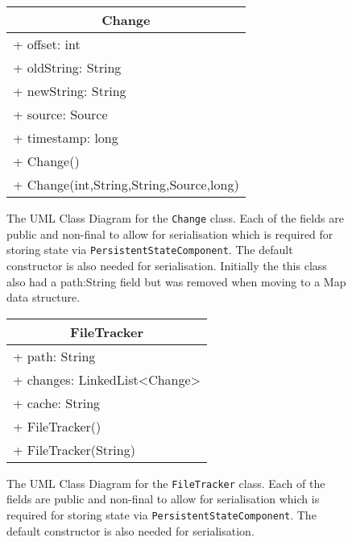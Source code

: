 \begin{figure}[H]
\centering
\begin{tabular}{|l|}
\hline
\multicolumn{1}{|c|}{\textbf{Change}}\\ \hline
+ offset: int\\
+ oldString: String\\
+ newString: String\\
+ source: Source\\
+ timestamp: long\\ \hline
+ Change()\\
+ Change(int,String,String,Source,long)\\ \hline
\end{tabular}
\caption[Change UML Class Diagram]{The UML Class Diagram for the \texttt{Change} class. Each of the fields are public and non-final to allow for serialisation which is required for storing state via \texttt{PersistentStateComponent}. The default constructor is also needed for serialisation. Initially the this class also had a path:String field but was removed when moving to a Map data structure.}
\label{fig:uml-class-change}
\end{figure}

\begin{figure}[H]
\centering
\begin{tabular}{|l|}
\hline
\multicolumn{1}{|c|}{\textbf{FileTracker}}\\ \hline
+ path: String\\
+ changes: LinkedList\textless{}Change\textgreater{}\\
+ cache: String\\ \hline
+ FileTracker()\\
+ FileTracker(String)\\ \hline
\end{tabular}
\caption[FileTracker UML Class Diagram]{The UML Class Diagram for the \texttt{FileTracker} class. Each of the fields are public and non-final to allow for serialisation which is required for storing state via \texttt{PersistentStateComponent}. The default constructor is also needed for serialisation.}
\label{fig:uml-class-filetracker}
\end{figure}

